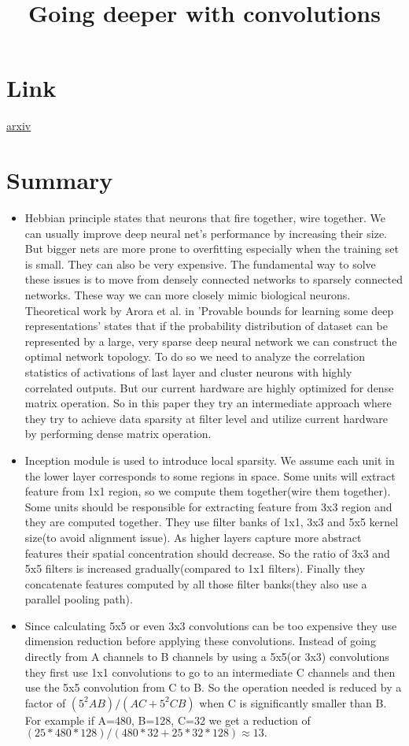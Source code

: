\documentclass{article}
\title{Going deeper with convolutions}
\author{}
\date{}
\begin{document}
\maketitle

\section*{Link}
\href{https://arxiv.org/abs/1409.4842}{arxiv} 

\section*{Summary}
\begin{itemize}
\item Hebbian principle states that neurons that fire together, wire together. We can usually improve deep neural net's performance by increasing their size. But bigger nets are more prone to overfitting especially when the training set is small. They can also be very expensive. The fundamental way to solve these issues is to move from densely connected networks to sparsely connected networks. These way we can more closely mimic biological neurons. Theoretical work by Arora et al. in 'Provable bounds for learning some deep representations' states that if the probability distribution of dataset can be represented by a large, very sparse deep neural network we can construct the optimal network topology. To do so we need to analyze the correlation statistics of activations of last layer and cluster neurons with highly correlated outputs. But our current hardware are highly optimized for dense matrix operation. So in this paper they try an intermediate approach where they try to achieve data sparsity at filter level and utilize current hardware by performing dense matrix operation. 
\item Inception module is used to introduce local sparsity. We assume each unit in the lower layer corresponds to some regions in space. Some units will extract feature from 1x1 region, so we compute them together(wire them together). Some units should be responsible for extracting feature from 3x3 region and they are computed together. They use filter banks of 1x1, 3x3 and 5x5 kernel size(to avoid alignment issue). As higher layers capture more abstract features their spatial concentration should decrease. So the ratio of 3x3 and 5x5 filters is increased gradually(compared to 1x1 filters). Finally they concatenate features computed by all those filter banks(they also use a parallel pooling path).    
\item Since calculating 5x5 or even 3x3 convolutions can be too expensive they use dimension reduction before applying these convolutions. Instead of going directly from A channels to B channels by using a 5x5(or 3x3) convolutions they first use 1x1 convolutions to go to an intermediate C channels and then use the 5x5 convolution from C to B. So the operation needed is reduced by a factor of $(5^2 AB)/(AC+5^2 CB)$ when C is significantly smaller than B. For example if A=480, B=128, C=32 we get a reduction of $(25*480*128)/(480*32+25*32*128)\approx 13. $  

\end{itemize}
\end{document}
